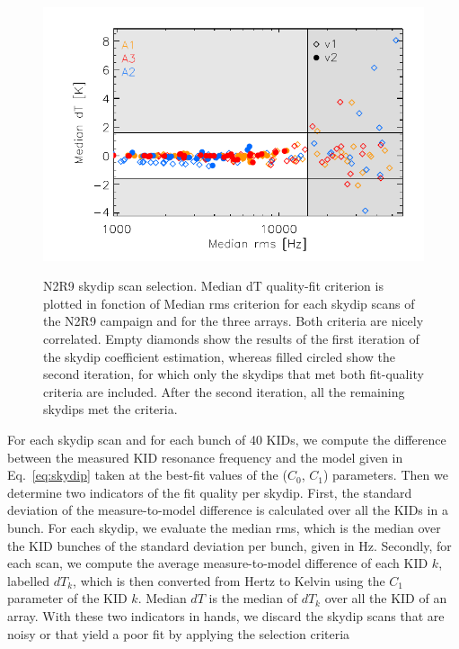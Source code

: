 \begin{figure}[p]
\begin{center}
\includegraphics[clip=true,width=0.9\linewidth]{Figures/Opacity/plot_skydip_selection_two_crit.pdf}
\label{fig:skydip_selection}
\caption{N2R9 skydip scan selection. Median dT quality-fit criterion is plotted in fonction of Median rms criterion for each skydip scans of the N2R9 campaign and for the three arrays. Both criteria are nicely correlated. Empty diamonds show the results of the first iteration of the skydip coefficient estimation, whereas filled circled show the second iteration, for which only the skydips that met both fit-quality criteria are included. After the second iteration, all the remaining skydips met the criteria.}
\end{center}
\end{figure}

For each skydip scan and for each bunch of 40 KIDs, we compute the
difference between the measured KID resonance frequency and the model
given in Eq.~\ref{eq:skydip} taken at the best-fit values of the
($C_0$, $C_1$) parameters. Then we determine two indicators
of the fit quality per skydip. First, the standard deviation of the
measure-to-model difference is calculated over all the KIDs in a
bunch. For each skydip, we evaluate the median rms, which is the
median over the KID bunches of the standard deviation per bunch, given
in Hz. Secondly, for each scan, we compute the average
measure-to-model difference of each KID $k$, labelled $dT_k$, which is
then converted from Hertz to Kelvin using the $C_1$ parameter of the
KID $k$. Median $dT$ is the median of $dT_k$ over all the KID of an
array. With these two indicators in hands, we discard the skydip scans
that are noisy or that yield a poor fit by applying the selection
criteria

